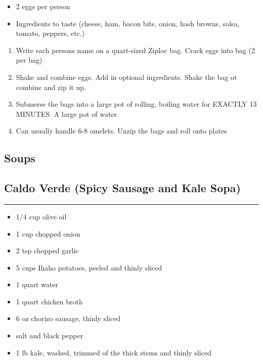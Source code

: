 \documentclass{article}
\begin{document}
\begin{framed}
\begin{itemize}
    \item 2 eggs per person 
    \item Ingredients to taste (cheese, ham, bacon bits, onion, hash browns, salsa, tomato, peppers, etc.)
\end{itemize}
\end{framed}

\begin{enumerate}
    \item
        Write each persons name on a quart-sized Ziploc bag. Crack eggs into bag (2 per bag)
    \item
        Shake and combine eggs. Add in optional ingredients. Shake the bag ot combine and zip it up.
    \item 
        Submerse the bags into a large pot of rolling, boiling water for EXACTLY 13 MINUTES. A large pot of water
    \item
        Can usually handle 6-8 omelets. Unzip the bags and roll onto plates
\end{enumerate}
\newpage

\vspace*{\fill}
\begin{center}
    \section{Soups}
\end{center}
\vspace*{\fill}
\newpage

\subsection{Caldo Verde (Spicy Sausage and Kale Sopa)} 
\noindent\rule[0.5ex]{\linewidth}{1pt}

\begin{framed}
    \begin{itemize}
        \item 1/4 cup olive oil
        \item 1 cup chopped onion
        \item 2 tsp chopped garlic
        \item 5 cups Ihaho potatoes, peeled and thinly sliced
        \item 1 quart water
        \item 1 quart chicken broth
        \item 6 oz chorizo sausage, thinly sliced
        \item salt and black pepper
        \item 1 lb kale, washed, trimmed of the thick stems and thinly sliced
    \end{itemize}
\end{framed}
\end{document}
